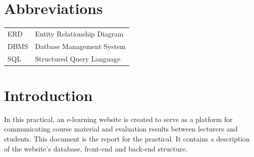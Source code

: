 \documentclass[a4paper,12pt]{article}
\numberwithin{equation}{section} %
\numberwithin{figure}{section}
\begin{document}
\thispagestyle{empty} 	%

\pagebreak


\pagebreak


\tableofcontents 



\section*{\Large{Abbreviations}}
\begin{center}
\begin{tabular}{l l}
ERD & Entity Relationship Diagram\\
DBMS & Datbase Management System\\
SQL & Structured Query Language\\
\end{tabular}
\end{center}

\listoffigures


\pagebreak


\section{Introduction}
In this practical, an e-learning website is created to serve as a platform for communicating course material and evaluation results between lecturers and students. This document is the report for the practical. It contains a description of the website's database, front-end and back-end structure.
\end{document}
